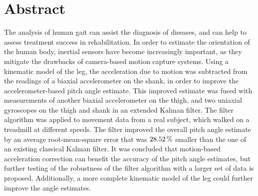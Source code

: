 
\begingroup
\let\clearpage\relax
\let\cleardoublepage\relax
\let\cleardoublepage\relax

\chapter*{Abstract}
The analysis of human gait can assist the diagnosis of diseases, and can help to assess treatment success in rehabilitation. In order to estimate the orientation of the human body, inertial sensors have become increasingly important, as they mitigate the drawbacks of camera-based motion capture systems. Using a kinematic model of the leg, the acceleration due to motion was subtracted from the readings of a biaxial accelerometer on the shank, in order to improve the accelerometer-based pitch angle estimate. This improved estimate was fused with measurements of another biaxial accelerometer on the thigh, and two uniaxial gyroscopes on the thigh and shank in an extended Kalman filter. The filter algorithm was applied to movement data from a real subject, which walked on a treadmill at different speeds. The filter improved the overall pitch angle estimate by an average root-mean-square error that was $\unit[28.52]{\%}$ smaller than the one of an existing classical Kalman filter. It was concluded that motion-based acceleration correction can benefit the accuracy of the pitch angle estimates, but further testing of the robustness of the filter algorithm with a larger set of data is proposed. Additionally, a more complete kinematic model of the leg could further improve the angle estimates.

\vfill

\endgroup			

\vfill